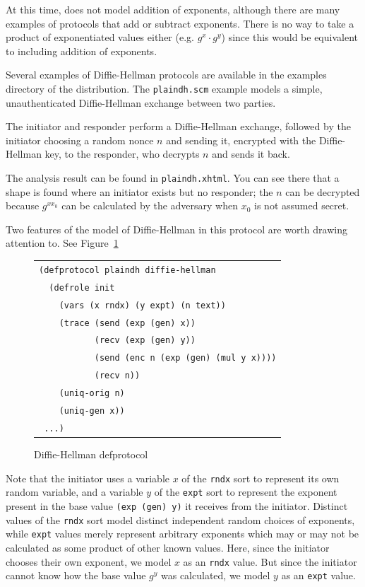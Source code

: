 At this time, {\cpsa} does not model addition of exponents, although
there are many examples of protocols that add or subtract exponents.
There is no way to take a product of exponentiated values either
(e.g. $g^x \cdot g^y$) since this would be equivalent to including
addition of exponents.

Several examples of Diffie-Hellman protocols are available in the examples
directory of the distribution.  The \texttt{plaindh.scm} example models
a simple, unauthenticated Diffie-Hellman exchange between two parties.

The initiator and responder perform a Diffie-Hellman exchange, followed by
the initiator choosing a random nonce $n$ and sending it, encrypted with the
Diffie-Hellman key, to the responder, who decrypts $n$ and sends it back.

The analysis result can be found in \texttt{plaindh.xhtml}.  You can see
there that a shape is found where an initiator exists but no
responder; the $n$ can be decrypted because $g^{x x_0}$ can be
calculated by the adversary when $x_0$ is not assumed secret.

Two features of the {\cpsa} model of Diffie-Hellman in this protocol are
worth drawing attention to.  See Figure~\ref{fig:plaindh defprotocol}

\begin{figure}
\begin{center}
\begin{tabular}{l}
\verb|(defprotocol plaindh diffie-hellman|\\
\verb|  (defrole init|\\
\verb|    (vars (x rndx) (y expt) (n text))|\\
\verb|    (trace (send (exp (gen) x))|\\
\verb|           (recv (exp (gen) y)) |\\
\verb|           (send (enc n (exp (gen) (mul y x))))|\\
\verb|           (recv n))|\\
\verb|    (uniq-orig n)|\\
\verb|    (uniq-gen x))|\\
\verb| ...)|
\end{tabular}
\end{center}
\caption{Diffie-Hellman defprotocol}
\label{fig:plaindh defprotocol}
\end{figure}

  Note that the initiator uses a variable
$x$ of the \texttt{rndx} sort to represent its own random variable,
and a variable $y$ of the \texttt{expt} sort to represent the exponent
present in the base value \texttt{(exp (gen) y)} it receives from the
initiator.  Distinct values of the \texttt{rndx} sort model distinct
independent random choices of exponents, while \texttt{expt} values
merely represent arbitrary exponents which may or may not be
calculated as some product of other known values.  Here, since the
initiator chooses their own exponent, we model $x$ as an \texttt{rndx}
value.  But since the initiator cannot know how the base value $g^y$
was calculated, we model $y$ as an \texttt{expt} value.

